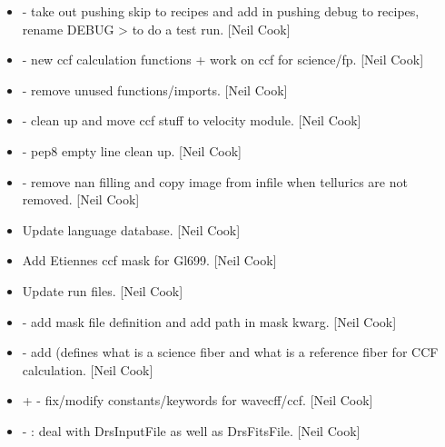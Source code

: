 \documentclass[a4paper,10pt,english]{report}
\begin{document}
\label{\detokenize{misc/changelog:id63}}\begin{itemize}
\item {} 
 - take out pushing skip to recipes
and add in pushing debug to recipes, rename DEBUG \textendash{}\textgreater{}  to do a
test run. {[}Neil Cook{]}

\item {} 
 - new ccf calculation functions + work on
ccf for science/fp. {[}Neil Cook{]}

\item {} 
 - remove unused functions/imports.
{[}Neil Cook{]}

\item {} 
 - clean up and move ccf stuff to velocity
module. {[}Neil Cook{]}

\item {} 
 - pep8 empty line clean up. {[}Neil Cook{]}

\item {} 
 - remove nan filling and copy image from infile when
tellurics are not removed. {[}Neil Cook{]}

\item {} 
Update language database. {[}Neil Cook{]}

\item {} 
Add Etiennes ccf mask for Gl699. {[}Neil Cook{]}

\item {} 
Update run files. {[}Neil Cook{]}

\item {} 
 - add mask file
definition and add path in \textendash{}mask kwarg. {[}Neil Cook{]}

\item {} 
 - add  (defines what is a
science fiber and what is a reference fiber for CCF calculation. {[}Neil
Cook{]}

\item {} 
 +  -
fix/modify constants/keywords for wavecff/ccf. {[}Neil Cook{]}

\item {} 
 - : deal with DrsInputFile as
well as DrsFitsFile. {[}Neil Cook{]}


\end{itemize}
\end{document}
